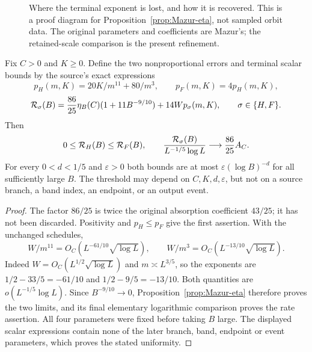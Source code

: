 \begin{figure}[ht]
\centering
{}
\caption{Where the terminal exponent is lost, and how it is recovered.
This is a proof diagram for Proposition~\ref{prop:Mazur-eta},
not sampled orbit data. The original parameters and coefficients are
Mazur's; the retained-scale comparison is the present refinement.}
\label{fig:Mazur-scales}
\end{figure}




\begin{proposition}
\label{prop:Mazur-terminal-rate}
Fix $C>0$ and $K\ge0$. Define the two nonproportional errors
and terminal scalar bounds by the source's exact expressions
\[
 p_H(m,K)=20K/m^{11}+80/m^3,\qquad p_F(m,K)=4p_H(m,K),
\]
\[
 {\cal R}_\sigma(B)=\frac{86}{25}\eta_B(C)
                  (1+11B^{-9/10})+14W p_\sigma(m,K),
 \qquad \sigma\in\{H,F\}.
\]
Then
\[
 0\le{\cal R}_H(B)\le{\cal R}_F(B),\qquad
 \frac{{\cal R}_\sigma(B)}{L^{-1/5}\log L}
       \longrightarrow\frac{86}{25}A_C .
\]
For every $0<d<1/5$ and $\varepsilon>0$ both bounds are
at most $\varepsilon(\log B)^{-d}$ for all sufficiently large
$B$. The threshold may depend on $C,K,d,\varepsilon$, but not
on a source branch, a band index, an endpoint, or an output event.
\end{proposition}
\begin{proof}
The factor $86/25$ is twice the original absorption coefficient
$43/25$; it has not been discarded. Positivity and $p_H\le p_F$
give the first assertion. With the unchanged schedules,
\[
 W/m^{11}=O_C(L^{-61/10}\sqrt{\log L}),\qquad
 W/m^3=O_C(L^{-13/10}\sqrt{\log L}).
\]
Indeed $W=O_C(L^{1/2}\sqrt{\log L})$ and
$m\asymp L^{3/5}$, so the exponents are
$1/2-33/5=-61/10$ and $1/2-9/5=-13/10$.
Both quantities are $o(L^{-1/5}\log L)$.
Since $B^{-9/10}\to0$, Proposition~\ref{prop:Mazur-eta}
therefore proves the two limits, and its final elementary
logarithmic comparison proves the rate assertion.
All four parameters were fixed before taking $B$ large.
The displayed scalar expressions contain none of the later
branch, band, endpoint or event parameters, which proves
the stated uniformity.
\end{proof}


